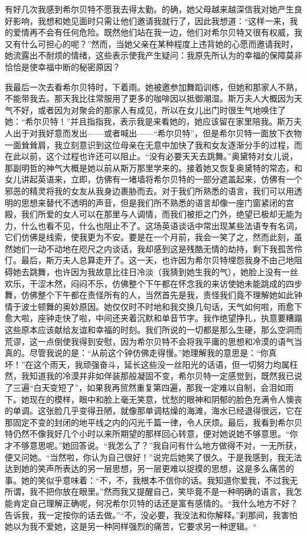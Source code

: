 \par 有好几次我感到希尔贝特不愿我去得太勤。的确，她父母越来越深信我对她产生良好影响，我想和她见面时只需让他们邀请我就行了，因此我想道：“这样一来，我的爱情再不会有任何危险。既然他们站在我一边，他们对希尔贝特又很有权威，我又有什么可担心的呢？”然而，当她父亲在某种程度上违背她的心愿而邀请我时，她流露出不耐烦的情绪，这些表示使我产生疑问：我原先所认为的幸福的保障莫非恰恰是使幸福中断的秘密原因？
\par 我最后一次去看希尔贝特时，下着雨。她被邀参加舞蹈训练，但她和那家人不熟，不能带我去。那天我比往常服用了更多的咖啡因以抵御潮湿。斯万夫人大概因为天气不好，或者因为对聚会的那家人有成见，所以在女儿出门时很生气地唤住了她：“希尔贝特！”并且指指我，表示我是来看她的，她应该留在家里陪我。斯万夫人出于对我好意而发出——或者喊出——“希尔贝特”，但是希尔贝特一面放下衣物一面耸耸肩，我立刻意识到这位母亲在无意中加快了我和女友逐渐分手的过程，而在此以前，这个过程也许还可以阻止。“没有必要天天去跳舞。”奥黛特对女儿说，那副明哲的神气大概是她以前从斯万那里学来的。接着她又恢复奥黛特的常态，和女儿讲起英语来，立即，仿佛有一堵墙将希尔贝特的一部分遮盖起来，仿佛有一个邪恶的精灵将我的女友从我身边裹胁而去。对于我们所熟悉的语言，我们可以用透明的思想来替代不透明的声音，但是我们所不熟悉的语言却像一座门窗紧闭的宫殿，我们所爱的女人可以在那里与人调情，而我们被拒之门外，绝望已极却无能为力，什么也看不见，什么也阻止不了。这场英语谈话中常出现某些法语专有名词，它们仿佛是线索，使我更为不安。要是在一个月前，我会一笑了之，然而此刻，虽然她们一动不动地在咫尺之内谈话，我却感到这是残酷无情的劫持，剩下我孤苦伶仃。最后，斯万夫人总算走开了。这一天，也许因为希尔贝特埋怨我身不由己地阻碍她去跳舞，也许因为我故意比往日冷淡（我猜到她生我的气），她脸上没有一丝欢乐，干涩木然，闷闷不乐，仿佛整个下午都在怀念我的来访使她未能跳成的四步舞，仿佛整个下午都在责怪所有的人，当然首先是我，责怪我们竟不理解她如此钟情于波士顿舞的奥妙原因。她仅仅时不时地和我交换几句话，天气如何啦，雨愈下愈大啦，座钟走快了啦，中间还夹着沉默和单音节字。我作绝望挣扎，执意要糟蹋这些原本应该献给友谊和幸福的时刻。我们所说的一切都是那么生硬，那么空洞而荒谬，这一点倒使我得到安慰，因为希尔贝特不会将我平庸的思想和冷漠的语气当真的。尽管我说的是：“从前这个钟仿佛走得慢。”她理解我的意思是：“你真坏！”在这个雨天，我顽强奋斗，延长这些没一丝阳光的话语，但一切努力均属枉然，我知道我的冷漠并非如佯装那般凝固不变，希尔贝特一定感觉到，既然我已说了三遍“白天变短了”，如果我再贸然重复第四遍，那我一定难以自制，会泪如雨下。她现在的模样，眼中和脸上毫无笑意，忧愁的眼神和阴郁的脸色充满令人懊丧的单调。这张脸几乎变得丑陋，就像那单调枯燥的海滩，海水已经退得很远，它在那固定不变的封闭的地平线之内的闪光千篇一律，令人厌烦。最后，我看到希尔贝特仍然不像我好几个小时以来所期望的那样回心转意，便对她说她不够意思。“你才不够意思呢。”她回答说。“我怎么了？”我自问有什么地方做得不对，一无所获，便又问她。“当然啦，你认为自己很好！”说完后她笑了很久。于是我感到，我无法达到她的笑声所表达的另一层思想，另一层更难以捉摸的思想，这是多么痛苦的事。她的笑似乎意味着：“不，不，我根本不信你的话。我知道你爱我，不过我无所谓，我不把你放在眼里。”然而我又提醒自己，笑毕竟不是一种明确的语言，我怎能肯定自己理解正确呢，何况希尔贝特的话还是富有感情的。“我什么地方不好？告诉我，我一定按你的话去做。”“不，没必要，我没法和你解释。”刹那间，我害怕她以为我不爱她，这是另一种同样强烈的痛苦，它要求另一种逻辑。“